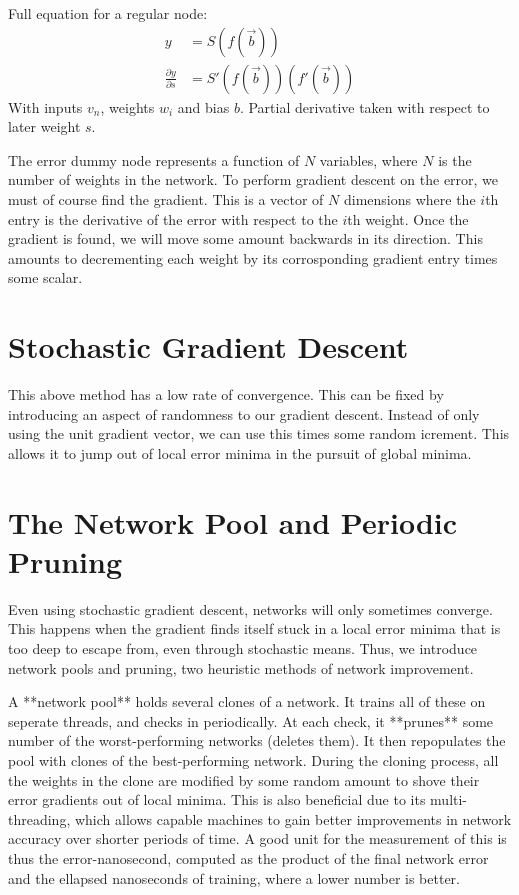 \documentclass[8pt]{amsart}
\begin{document}
Full equation for a regular node:
$$
\begin{aligned}
    y &= S(f(\vec{b})) \\
    \frac{\partial y}{\partial s} &= S'(f(\vec{b}))(f'(\vec{b}))
\end{aligned}
$$
With inputs $v_n$, weights $w_i$ and bias $b$.
Partial derivative taken with respect to later weight $s$.

The error dummy node represents a function of $N$ variables, where $N$ is the
number of weights in the network. To perform gradient descent on the error, we
must of course find the gradient. This is a vector of $N$ dimensions where the
$i$th entry is the derivative of the error with respect to the $i$th weight.
Once the gradient is found, we will move some amount backwards in its direction.
This amounts to decrementing each weight by its corrosponding gradient entry
times some scalar.

\section{Stochastic Gradient Descent}

This above method has a low rate of convergence. This can be fixed by
introducing an aspect of randomness to our gradient descent. Instead of only
using the unit gradient vector, we can use this times some random icrement. This
allows it to jump out of local error minima in the pursuit of global minima.

\section{The Network Pool and Periodic Pruning}

Even using stochastic gradient descent, networks will only sometimes converge.
This happens when the gradient finds itself stuck in a local error minima that is
too deep to escape from, even through stochastic means. Thus, we introduce
network pools and pruning, two heuristic methods of network improvement.

A **network pool** holds several clones of a network. It trains all of these on
seperate threads, and checks in periodically. At each check, it **prunes** some
number of the worst-performing networks (deletes them). It then repopulates the
pool with clones of the best-performing network. During the cloning process, all
the weights in the clone are modified by some random amount to shove their
error gradients out of local minima. This is also beneficial due to its multi-
threading, which allows capable machines to gain better improvements in network
accuracy over shorter periods of time. A good unit for the measurement of this
is thus the error-nanosecond, computed as the product of the final network error
and the ellapsed nanoseconds of training, where a lower number is better.
\end{document}
